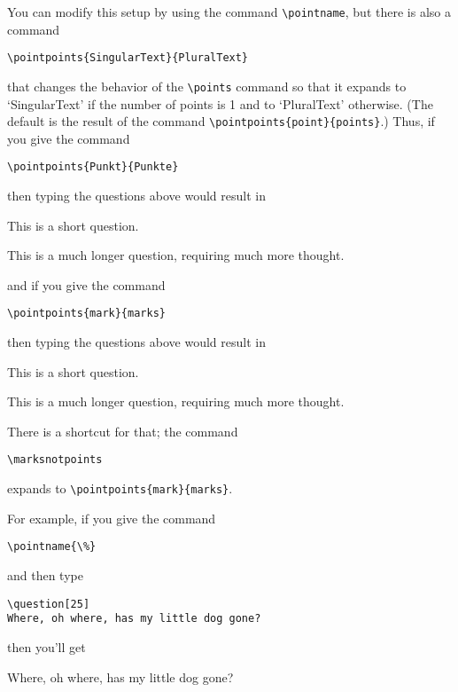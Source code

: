\documentclass[12pt]{exam}
\begin{document}
You can modify this setup by using the command \verb"\pointname", but
there is also a command
\begin{center}
  \verb"\pointpoints{SingularText}{PluralText}"
\end{center}
that changes the behavior of the \verb"\points" command so that it
expands to `SingularText' if the number of points is 1 and to
`PluralText' otherwise.  (The default is the result of the command
\verb"\pointpoints{point}{points}".)  Thus, if you give the
command
%
\begin{center}
  \verb"\pointpoints{Punkt}{Punkte}"
\end{center}
%
then typing the questions above would result in
%
\begin{questions}
\question[1]
This is a short question.

\question[5]
This is a much longer question, requiring much more thought.
\end{questions}
%
and if you give the command
%
\begin{center}
  \verb"\pointpoints{mark}{marks}"
\end{center}
%
then typing the questions above would result in
%
\begin{questions}
\question[1]
This is a short question.

\question[5]
%
This is a much longer question, requiring much more thought.
\end{questions}
There is a shortcut for that; the command
\begin{center}
  \verb"\marksnotpoints"
\end{center}
expands to \verb"\pointpoints{mark}{marks}".


\bigskip

For example, if you give the command
%
\begin{center}
\verb"\pointname{\%}"
\end{center}
%
and then type
%
\begin{verbatim}
\question[25]
Where, oh where, has my little dog gone?
\end{verbatim}
%
then you'll get
\pointname{\%}
\nopointsinmargin
\noboxedpoints
\begin{questions}
\question[25]
Where, oh where, has my little dog gone?
\end{questions}
\pointname{ \points}
%
\end{document}
